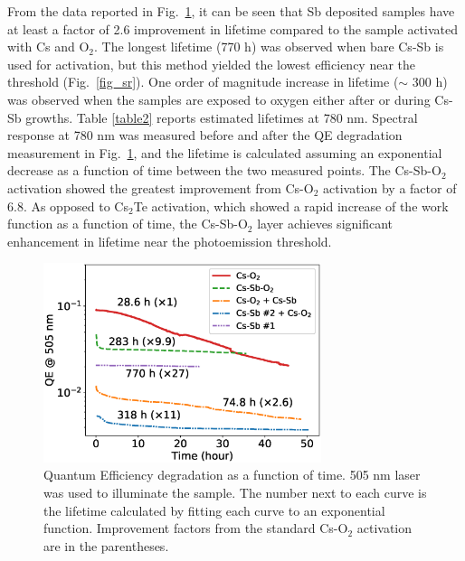 From the data reported in Fig.~\ref{fig_lifetime}, it can be seen that Sb deposited samples have at least a factor of 2.6 improvement in lifetime compared to the sample activated with Cs and O$_2$. The longest lifetime (770 h) was observed when bare Cs-Sb is used for activation, but this method yielded the lowest efficiency near the threshold (Fig.~\ref{fig_sr}).
One order of magnitude increase in lifetime ($\sim$ 300 h) was observed when the samples are exposed to oxygen either after or during Cs-Sb growths.  
Table \ref{table2} reports estimated lifetimes at 780 nm.
Spectral response at 780 nm was measured before and after the QE degradation measurement in Fig.~\ref{fig_lifetime}, and the lifetime is calculated assuming an exponential decrease as a function of time between the two measured points. The Cs-Sb-O$_2$ activation showed the greatest improvement from Cs-O$_2$ activation by a factor of 6.8.
As opposed to Cs$_2$Te activation, which showed a rapid increase of the work function as a function of time,\cite{sugiyama2011_StudyElectronAffinity} the Cs-Sb-O$_2$ layer achieves significant enhancement in lifetime near the photoemission threshold.



\begin{figure}
	\centering
	\includegraphics*[width=230pt]{figs/CsSbO/lifetime.eps}
	\caption{Quantum Efficiency degradation as a function of time. 505 nm laser was used to illuminate the sample. The number next to each curve is the lifetime calculated by fitting each curve to an exponential function. Improvement factors from the standard Cs-O$_2$ activation are in the parentheses.}
	\label{fig_lifetime}
\end{figure}



